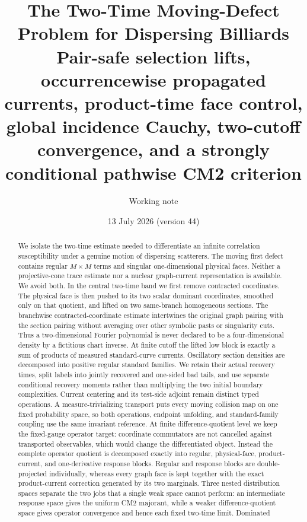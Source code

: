 \documentclass[11pt]{article}
\title{The Two-Time Moving-Defect Problem for Dispersing Billiards\\
\large Pair-safe selection lifts, occurrencewise propagated currents,
product-time face control,
global incidence Cauchy,
two-cutoff convergence, and a strongly conditional
pathwise CM2 criterion}
\author{Working note}
\date{13 July 2026 (version 44)}
\begin{document}
\maketitle

\begin{abstract}
We isolate the two-time estimate needed to differentiate an infinite
correlation susceptibility under a genuine motion of dispersing scatterers.
The moving first defect contains regular $M\times M$ terms and singular
one-dimensional physical faces.  Neither a projective-cone trace estimate nor
a nuclear graph-current representation is available.  We avoid both.  In the
central two-time band we first remove contracted coordinates.  The physical
face is then pushed to its two scalar dominant coordinates, smoothed only on
that quotient, and lifted on two same-branch homogeneous sections.  The
branchwise contracted-coordinate estimate intertwines the original graph
pairing with the section pairing without averaging over other symbolic pasts
or singularity cuts.  Thus a two-dimensional Fourier polynomial is never
declared to be a four-dimensional density by a fictitious chart inverse.  At
finite cutoff the lifted low block is exactly a sum of products of measured
standard-curve currents.  Oscillatory section densities are decomposed into
positive regular standard families.  We retain their actual recovery times,
split labels into jointly recovered and one-sided bad tails, and use separate
conditional recovery moments rather than multiplying the two initial boundary
complexities.  Current centering and its test-side adjoint remain
distinct typed operations.  A measure-trivializing transport puts every
moving collision map on one fixed probability space, so both operations,
endpoint unfolding, and standard-family coupling use the same invariant
reference.  At finite difference-quotient level we keep the fixed-gauge
operator target: coordinate commutators are not cancelled against transported
observables, which would change the differentiated object.  Instead the
complete operator quotient is decomposed exactly into regular, physical-face,
product-current, and one-derivative response blocks.  Regular and response
blocks are double-projected individually, whereas every graph face is kept
together with the exact product-current correction generated by its two
marginals.  Three nested distribution spaces separate the two
jobs that a single weak space cannot perform: an intermediate response space
gives the uniform CM2 majorant, while a weaker difference-quotient space gives
operator convergence and hence each fixed two-time limit.  Dominated

\end{abstract}
\end{document}

